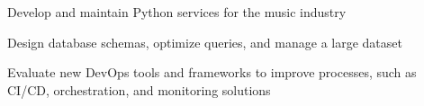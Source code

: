 \documentclass[]{willianpaixao-resume}
\begin{document}
\begin{minipage}[t]{0.64\textwidth}
\sectionsep
\begin{tightemize}
\item Develop and maintain Python services for the music industry
\item Design database schemas, optimize queries, and manage a large dataset
\item Evaluate new DevOps tools and frameworks to improve processes, such as CI/CD, orchestration, and monitoring solutions
\end{tightemize}
\end{minipage}
\end{document}
